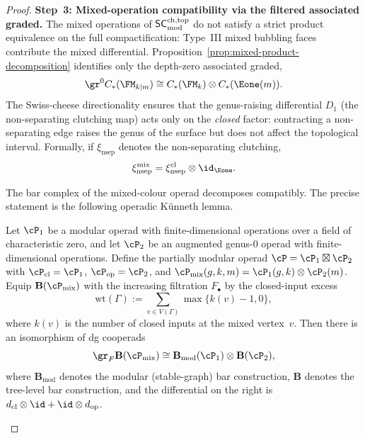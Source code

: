 \begin{proof}
\medskip\noindent
\textbf{Step~3: Mixed-operation compatibility via the filtered
associated graded.}
The mixed operations of $\mathsf{SC}^{\mathrm{ch,top}}_{\mathrm{mod}}$ do not satisfy a strict product
equivalence on the full compactification: Type~III mixed bubbling
faces contribute the mixed differential. Proposition~\ref{prop:mixed-product-decomposition}
identifies only the depth-zero associated graded,
\[
\gr^0 C_\ast(\FM_{k|m})
\cong C_\ast(\FM_k)\otimes C_\ast(\Eone(m)).
\]
The Swiss-cheese directionality ensures that the genus-raising
differential $D_1$ (the non-separating clutching map) acts
only on the \emph{closed} factor: contracting a non-separating
edge raises the genus of the surface but does not affect the
topological interval. Formally, if $\xi_{\mathrm{nsep}}$ denotes
the non-separating clutching,
\[
 \xi_{\mathrm{nsep}}^{\mathrm{mix}}
 = \xi_{\mathrm{nsep}}^{\mathrm{cl}} \otimes \id_{\Eone}.
\]

The bar complex of the mixed-colour operad
decomposes compatibly. The precise statement is the following
operadic K\"unneth lemma.

\begin{lemma}
\label{lem:operadic-kunneth}
Let $\cP_1$ be a modular operad with finite-dimensional operations
over a field of characteristic zero, and let $\cP_2$ be an
augmented genus-$0$ operad with finite-dimensional operations.
Define the partially modular operad
$\cP = \cP_1 \boxtimes \cP_2$ with
$\cP_{\mathrm{cl}} = \cP_1$,
$\cP_{\mathrm{op}} = \cP_2$, and
$\cP_{\mathrm{mix}}(g,k,m) = \cP_1(g,k) \otimes \cP_2(m)$.
Equip $\mathbf{B}(\cP_{\mathrm{mix}})$ with the increasing
filtration $F_\bullet$ by the closed-input excess
\[
\mathrm{wt}(\Gamma)
:=
\sum_{v \in V(\Gamma)} \max\{k(v)-1, 0\},
\]
where $k(v)$ is the number of closed inputs at the mixed
vertex~$v$. Then there is an isomorphism of dg cooperads
\[
 \gr_F \mathbf{B}(\cP_{\mathrm{mix}})
 \cong
 \mathbf{B}_{\mathrm{mod}}(\cP_1)
 \otimes \mathbf{B}(\cP_2),
\]
where $\mathbf{B}_{\mathrm{mod}}$ denotes the modular
\textup{(}stable-graph\textup{)} bar construction,
$\mathbf{B}$ denotes the tree-level bar construction, and the
differential on the right is
$d_{\mathrm{cl}} \otimes \id + \id \otimes d_{\mathrm{op}}$.
\end{lemma}


\end{proof}
